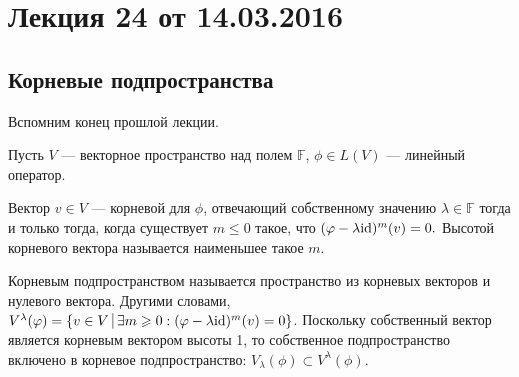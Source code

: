


\def\limref#1#2{{#1}\negmedspace\mid_{#2}}

\section{Лекция 24 от 14.03.2016}

\subsection*{Корневые подпространства}

Вспомним конец прошлой лекции.

Пусть $V$ --- векторное пространство над полем $\mathbb{F}$, $\phi \in L(V)$ --- линейный оператор.

Вектор $v \in V$ --- корневой для $\phi$, отвечающий собственному значению $\lambda \in \mathbb{F}$ тогда и только тогда, когда существует $m \leqslant 0 $ такое, что $(\varphi - \lambda \mathrm{id})^{m}(v) = 0.$ Высотой корневого вектора называется наименьшее такое $m$.

Корневым подпространством называется пространство из корневых векторов и нулевого вектора. Другими словами, $V^{\lambda}(\phi) = \{v \in V \; \vline \; \exists m \geqslant 0 : (\phi - \lambda \id)^{m}(v) = 0\}$. Поскольку собственный вектор является корневым вектором высоты 1, то собственное подпространство включено в корневое подпространство: $V_{\lambda}(\phi) \subset V^{\lambda}(\phi).$

